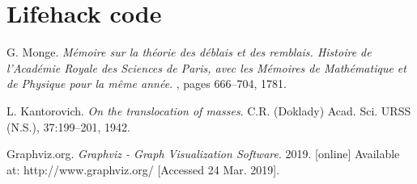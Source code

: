 \documentclass[journal,onecolumn]{IEEEtran}
\begin{document}
\appendices

\section{Lifehack code}
\label{app1}
\lstset{basicstyle=\ttfamily}



\begin{thebibliography}{1}

G. Monge. \emph{Mémoire sur la théorie des déblais et des remblais. Histoire de l’Académie Royale des Sciences de Paris, avec les Mémoires de Mathématique et de Physique pour la même année}. , pages 666–704, 1781.

L. Kantorovich. \emph{On the translocation of masses}. C.R. (Doklady) Acad. Sci. URSS (N.S.), 37:199–201, 1942.

Graphviz.org. \emph{Graphviz - Graph Visualization Software}. 2019. [online] Available at: http://www.graphviz.org/ [Accessed 24 Mar. 2019].

\end{thebibliography}

\end{document}
